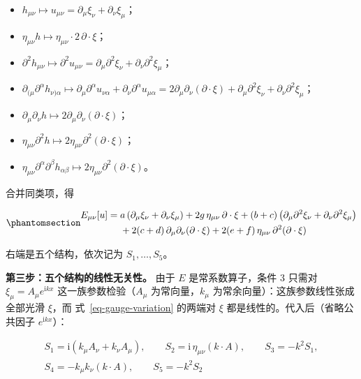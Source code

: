 \documentclass[
  chinese,
  a4paper,
  UTF8,
  12pt,
  oneside,
  openany]{ctexbook}
\providecommand{\tightlist}{%
  \setlength{\itemsep}{0pt}\setlength{\parskip}{0pt}}
\theoremstyle{plain}
\theoremstyle{plain}
\theoremstyle{plain}
\theoremstyle{definition}
\theoremstyle{plain}
\theoremstyle{plain}
\theoremstyle{remark}
\begin{document}
\begin{itemize}
\tightlist
\item
  \(h_{\mu\nu}\mapsto u_{\mu\nu}=\partial_{\mu}\xi_{\nu}+\partial_{\nu}\xi_{\mu}\)；
\item
  \(\eta_{\mu\nu}h\mapsto\eta_{\mu\nu}\cdot 2\,\partial\cdot\xi\)；
\item
  \(\partial^{2}h_{\mu\nu}\mapsto\partial^{2}u_{\mu\nu}=\partial_{\mu}\partial^{2}\xi_{\nu}+\partial_{\nu}\partial^{2}\xi_{\mu}\)；
\item
  \(\partial_{(\mu}\partial^{\alpha}h_{\nu)\alpha}\mapsto\partial_{\mu}\partial^{\alpha}u_{\nu\alpha}+\partial_{\nu}\partial^{\alpha}u_{\mu\alpha}
  =2\partial_{\mu}\partial_{\nu}(\partial\cdot\xi)+\partial_{\mu}\partial^{2}\xi_{\nu}+\partial_{\nu}\partial^{2}\xi_{\mu}\)；
\item
  \(\partial_{\mu}\partial_{\nu}h\mapsto2\partial_{\mu}\partial_{\nu}(\partial\cdot\xi)\)；
\item
  \(\eta_{\mu\nu}\partial^{2}h\mapsto2\eta_{\mu\nu}\partial^{2}(\partial\cdot\xi)\)；
\item
  \(\eta_{\mu\nu}\partial^{\alpha}\partial^{\beta}h_{\alpha\beta}\mapsto2\eta_{\mu\nu}\partial^{2}(\partial\cdot\xi)\)。
\end{itemize}

合并同类项，得

\begin{equation}\protect\phantomsection\label{eq-gauge-variation}{
\begin{aligned}
E_{\mu\nu}[u]
={}&a\left(\partial_{\mu}\xi_{\nu}+\partial_{\nu}\xi_{\mu}\right)
+2g\,\eta_{\mu\nu}\,\partial\cdot\xi
+(b+c)\left(\partial_{\mu}\partial^{2}\xi_{\nu}+\partial_{\nu}\partial^{2}\xi_{\mu}\right)\\
&+2(c+d)\,\partial_{\mu}\partial_{\nu}(\partial\cdot\xi)
+2(e+f)\,\eta_{\mu\nu}\,\partial^{2}(\partial\cdot\xi)
\end{aligned}
}\end{equation}

右端是五个结构，依次记为 \(S_{1},\dots,S_{5}\)。

\textbf{第三步：五个结构的线性无关性。} 由于 \(E\) 是常系数算子，条件 3
只需对 \(\xi_{\mu}=A_{\mu}e^{\mathrm{i}kx}\) 这一族参数检验（\(A_{\mu}\)
为常向量，\(k_{\mu}\) 为常余向量）：这族参数线性张成全部光滑 \(\xi\)，而
式~\ref{eq-gauge-variation} 的两端对 \(\xi\)
都是线性的。代入后（省略公共因子 \(e^{\mathrm{i}kx}\)）：

\[
\begin{gathered}
S_{1}=\mathrm{i}\left(k_{\mu}A_{\nu}+k_{\nu}A_{\mu}\right),
\qquad
S_{2}=\mathrm{i}\,\eta_{\mu\nu}(k\cdot A),
\qquad
S_{3}=-k^{2}S_{1},\\
S_{4}=-k_{\mu}k_{\nu}(k\cdot A),
\qquad
S_{5}=-k^{2}S_{2}
\end{gathered}
\]
\end{document}
